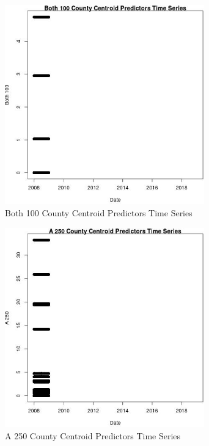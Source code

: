 \begin{figure} 
\centering  
\includegraphics[width=0.77\textwidth]{Code_Outputs/df_report_ML_predictors_CountyCentroid_Locations_Dates_2008-01-01to2018-12-31_Both_100vDate.jpg} 
\caption{\label{fig:df_report_ML_predictors_CountyCentroid_Locations_Dates_2008-01-01to2018-12-31Both_100vDate}Both 100 County Centroid Predictors Time Series} 
\end{figure} 
 

\begin{figure} 
\centering  
\includegraphics[width=0.77\textwidth]{Code_Outputs/df_report_ML_predictors_CountyCentroid_Locations_Dates_2008-01-01to2018-12-31_A_250vDate.jpg} 
\caption{\label{fig:df_report_ML_predictors_CountyCentroid_Locations_Dates_2008-01-01to2018-12-31A_250vDate}A 250 County Centroid Predictors Time Series} 
\end{figure} 
 

